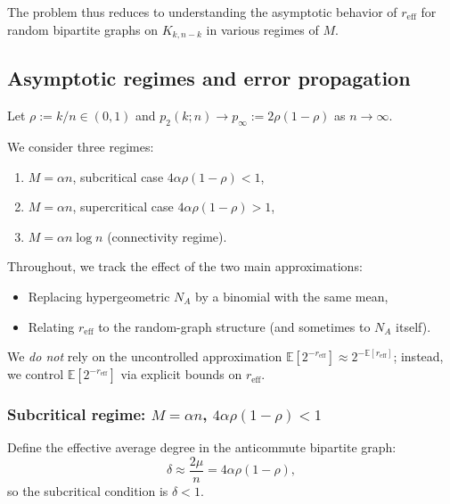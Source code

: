 \documentclass[a4paper,onecolumn,notitlepage,nofootinbib,longbibliography,superscriptaddress, floatfix, pra, aps, 10pt]{revtex4-2}
\begin{document}
The problem thus reduces to understanding the asymptotic behavior of $r_{\mathrm{eff}}$ for random bipartite graphs on $K_{k,n-k}$ in various regimes of $M$.

\subsection{Asymptotic regimes and error propagation}

Let $\rho := k/n \in (0,1)$ and $p_2(k;n)\to p_\infty := 2\rho(1-\rho)$ as $n\to\infty$.

We consider three regimes:
\begin{enumerate}
  \item $M=\alpha n$, subcritical case $4\alpha\rho(1-\rho)<1$,
  \item $M=\alpha n$, supercritical case $4\alpha\rho(1-\rho)>1$,
  \item $M=\alpha n\log n$ (connectivity regime).
\end{enumerate}

Throughout, we track the effect of the two main approximations:

\begin{itemize}
  \item Replacing hypergeometric $N_A$ by a binomial with the same mean,
  \item Relating $r_{\mathrm{eff}}$ to the random-graph structure (and sometimes to $N_A$ itself).
\end{itemize}

We \emph{do not} rely on the uncontrolled approximation $\mathbb{E}[2^{-r_{\mathrm{eff}}}] \approx 2^{-\mathbb{E}[r_{\mathrm{eff}}]}$; instead, we control $\mathbb{E}[2^{-r_{\mathrm{eff}}}]$ via explicit bounds on $r_{\mathrm{eff}}$.

\subsubsection{Subcritical regime: $M = \alpha n$, $4\alpha\rho(1-\rho)<1$}

Define the effective average degree in the anticommute bipartite graph:
\begin{equation}
  \delta \approx \frac{2\mu}{n} = 4\alpha\rho(1-\rho),
\end{equation}
so the subcritical condition is $\delta<1$.
\end{document}
